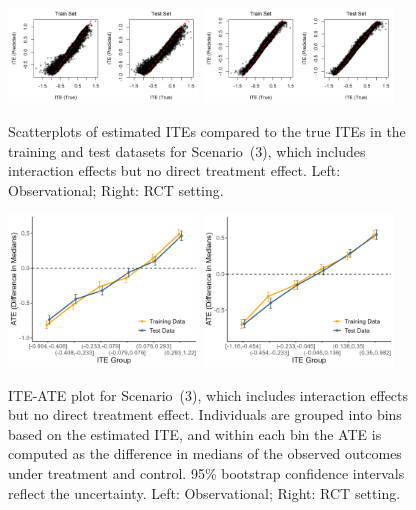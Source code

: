 \begin{figure}[htbp]
\centering
\includegraphics[width=0.45\textwidth]{img/results/observ_scenario3_ITE_scatter_train_test.png}
\includegraphics[width=0.45\textwidth]{img/results/rct_scenario3_ITE_scatter_train_test.png}
\caption{Scatterplots of estimated ITEs compared to the true ITEs in the training and test datasets for Scenario~(3), which includes interaction effects but no direct treatment effect. Left: Observational; Right: RCT setting.}
\label{fig:scenario3_ite_scatter_train_test}
\end{figure}




\begin{figure}[htbp]
\centering
\includegraphics[width=0.45\textwidth]{img/results/observ_scenario3_ITE_cATE.png}
\includegraphics[width=0.45\textwidth]{img/results/rct_scenario3_ITE_cATE.png}
\caption{ITE-ATE plot for Scenario~(3), which includes interaction effects but no direct treatment effect. Individuals are grouped into bins based on the estimated ITE, and within each bin the ATE is computed as the difference in medians of the observed outcomes under treatment and control. 95\% bootstrap confidence intervals reflect the uncertainty. Left: Observational; Right: RCT setting.}
\label{fig:scenario3_ite_cATE}
\end{figure}


